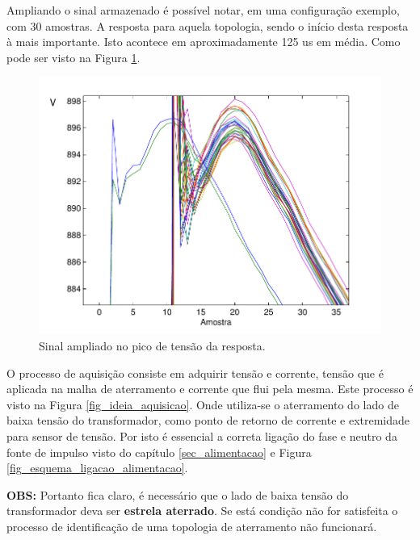 \documentclass[a4paper, 10pt]{article}
\begin{document}
Ampliando o sinal armazenado é possível notar, em uma configuração exemplo, com 30
amostras. A resposta para aquela topologia, sendo o início desta resposta à mais 
importante. Isto acontece em aproximadamente 125 us em média. Como pode ser visto
na Figura \ref{fig_sinal_detalhe}.

\begin{figure}[!h]
    \caption{\label{fig_sinal_detalhe} Sinal ampliado no pico de tensão da resposta.}
	    \begin{center}
            \includegraphics[scale=0.5]{../fotos/sinal/sinal_detalhes-eps-converted-to.pdf}
	    \end{center}
\end{figure}

O processo de aquisição consiste em adquirir tensão e corrente, tensão 
que é aplicada na malha de aterramento e corrente que flui pela mesma. 
Este processo é visto na Figura \ref{fig_ideia_aquisicao}. Onde utiliza-se
o aterramento do lado de baixa tensão do transformador, como ponto de retorno
de corrente e extremidade para sensor de tensão. Por isto é essencial a 
correta ligação do fase e neutro da fonte de impulso visto do capítulo \ref{sec_alimentacao}
e Figura \ref{fig_esquema_ligacao_alimentacao}.

\textbf{OBS:} Portanto fica claro, é necessário que o lado de baixa tensão
do transformador deva ser \textbf{estrela aterrado}. Se está condição não for 
satisfeita o processo de identificação de uma topologia de aterramento não 
funcionará.
\end{document}
